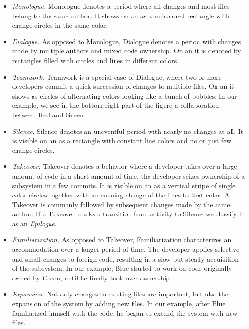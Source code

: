\begin{itemize}

\item \emph{Monologue.} Monologue denotes a period where all changes and most files belong to the same author. It shows on an \omap as a unicolored rectangle with change circles in the same color.

\item \emph{Dialogue.} As opposed to Monologue, Dialogue denotes a period with changes made by multiple authors and mixed code ownership. On an \omap it is denoted by rectangles filled with circles and lines in different colors.

\item \emph{Teamwork.} Teamwork is a special case of Dialogue, where two or more developers commit a quick succession of changes to multiple files. On an \omap it shows as circles of alternating colors looking like a bunch of bubbles. In our example, we see in the bottom right part of the figure a collaboration between Red and Green.

\item \emph{Silence.} Silence denotes an uneventful period with nearly no changes at all. It is visible on an \omap as a rectangle with constant line colors and no or just few change circles.

\item \emph{Takeover.} Takeover denotes a behavior where a developer takes over a large amount of code in a short amount of time, \ie the developer seizes ownership of a subsystem in a few commits. It is visible on an \omap as a vertical stripe of single color circles together with an ensuing change of the lines to that color. A Takeover is commonly followed by subsequent changes made by the same author. If a Takeover marks a transition from activity to Silence we classify it as an \emph{Epilogue}.

\item \emph{Familiarization.} As opposed to Takeover, Familiarization characterizes an accommodation over a longer period of time. The developer applies selective and small changes to foreign code, resulting in a slow but steady acquisition of the subsystem. In our example, Blue started to work on code originally owned by Green, until he finally took over ownership.

\item \emph{Expansion.} Not only changes to existing files are important, but also the expansion of the system by adding new files. In our example, after Blue familiarized himself with the code, he began to extend the system with new files.


\end{itemize}
